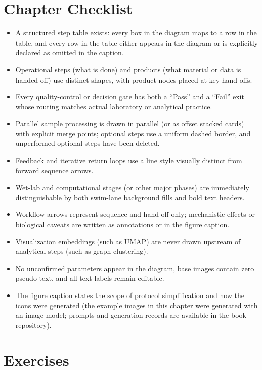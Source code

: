 \section{Chapter Checklist}

\begin{itemize}
\item A structured step table exists: every box in the diagram maps to a row in the table, and every row in the table either appears in the diagram or is explicitly declared as omitted in the caption.
\item Operational steps (what is done) and products (what material or data is handed off) use distinct shapes, with product nodes placed at key hand-offs.
\item Every quality-control or decision gate has both a ``Pass'' and a ``Fail'' exit whose routing matches actual laboratory or analytical practice.
\item Parallel sample processing is drawn in parallel (or as offset stacked cards) with explicit merge points; optional steps use a uniform dashed border, and unperformed optional steps have been deleted.
\item Feedback and iterative return loops use a line style visually distinct from forward sequence arrows.
\item Wet-lab and computational stages (or other major phases) are immediately distinguishable by both swim-lane background fills and bold text headers.
\item Workflow arrows represent sequence and hand-off only; mechanistic effects or biological caveats are written as annotations or in the figure caption.
\item Visualization embeddings (such as UMAP) are never drawn upstream of analytical steps (such as graph clustering).
\item No unconfirmed parameters appear in the diagram, base images contain zero pseudo-text, and all text labels remain editable.
\item The figure caption states the scope of protocol simplification and how the icons were generated (the example images in this chapter were generated with an image model; prompts and generation records are available in the book repository).
\end{itemize}

\section{Exercises}

